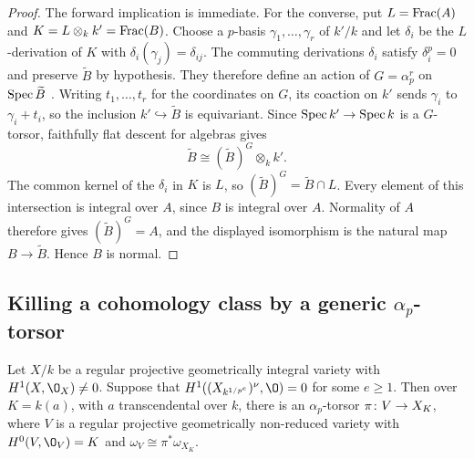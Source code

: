 \begin{proof}
The forward implication is immediate.
For the converse, put $L = \operatorname{Frac}(A)$ and $K = L\otimes_k k' = \operatorname{Frac}(B)$.
Choose a $p$-basis $\gamma_1,\ldots,\gamma_r$ of $k'/k$ and let $\delta_i$ be the $L$-derivation of $K$ with $\delta_i(\gamma_j) = \delta_{ij}$.
The commuting derivations $\delta_i$ satisfy $\delta_i^p = 0$ and preserve $\widetilde B$ by hypothesis.
They therefore define an action of $G = \alpha_p^r$ on $\operatorname{Spec}\widetilde B$ \cite[Section~4]{ST23}.
Writing $t_1,\ldots,t_r$ for the coordinates on $G$, its coaction on $k'$ sends $\gamma_i$ to $\gamma_i+t_i$, so the inclusion $k'\hookrightarrow\widetilde B$ is equivariant.
Since $\operatorname{Spec} k'\to\operatorname{Spec} k$ is a $G$-torsor, faithfully flat descent for algebras gives
\[
  \widetilde B\cong (\widetilde B)^G\otimes_k k'.
\]
The common kernel of the $\delta_i$ in $K$ is $L$, so $(\widetilde B)^G = \widetilde B\cap L$.
Every element of this intersection is integral over $A$, since $B$ is integral over $A$.
Normality of $A$ therefore gives $(\widetilde B)^G = A$, and the displayed isomorphism is the natural map $B\to\widetilde B$.
Hence $B$ is normal.
\end{proof}


\subsection{Killing a cohomology class by a generic $\alpha_p$-torsor}\label{subsec:generic-alpha-p-torsor}
\begin{lemma}\label{lem:generic-alpha-p-torsor}
Let $X/k$ be a regular projective geometrically integral variety with $H^1(X,\O_X)\neq 0$.
Suppose that $H^1((X_{k^{1/p^e}})^\nu,\O) = 0$ for some $e\geq 1$.
Then over $K = k(a)$, with $a$ transcendental over $k$, there is an $\alpha_p$-torsor $\pi\colon V\to X_K$, where $V$ is a regular projective geometrically non-reduced variety with $H^0(V,\O_V) = K$ and $\omega_V\cong\pi^*\omega_{X_K}$.
\end{lemma}

